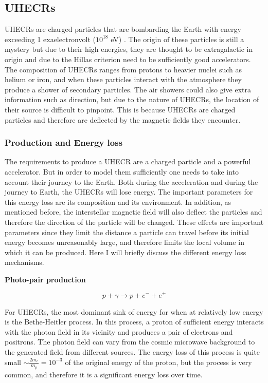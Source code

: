 \subsection{UHECRs}

UHECRs are charged particles that are bombarding the Earth with energy exceeding 1 exaelectronvolt ($10^{18}$ eV) \cite{Alves_Batista_2019}. The origin of 
these particles is still a mystery but due to their high energies, they are thought to be extragalactic in origin and due to the Hillas criterion need to be sufficiently good accelerators.
The composition of UHECRs ranges from protons to heavier nuclei such as helium or iron, and when these particles interact with the atmosphere they produce a shower of secondary particles.
The air showers could also give extra information such as direction, but due to the nature of UHECRs, the location of their source is
difficult to pinpoint. This is because UHECRs are charged particles and therefore are deflected by the magnetic fields they encounter.

\subsubsection{Production and Energy loss}
The requirements to produce a UHECR are a charged particle and a powerful accelerator. But in order to
model them sufficiently one needs to take into account their journey to the Earth. Both during the acceleration and during the journey to Earth, the UHECRs will lose energy. 
The important parameters for this energy loss are its composition and its environment. In addition, as mentioned before, the interstellar magnetic field will also deflect the particles and therefore the direction of the particle will be changed. 
These effects are important parameters since they limit the 
distance a particle can travel before its initial energy becomes unreasonably large, and therefore limits the local volume in which it can be produced. 
Here I will briefly discuss the different energy loss mechanisms.

\textbf{Photo-pair production}

\begin{equation}
    p + \gamma \rightarrow p + e^- + e^+
\end{equation}

For UHECRs, the most dominant sink of energy for when at relatively low energy is the Bethe-Heitler process. In this process, a proton of sufficient energy interacts with the 
photon field in its vicinity and produces a pair of electrons and positrons. The photon field can vary from the cosmic microwave background to the generated field from different sources. 
The energy loss of this process is quite small $\sim \frac{2m_e}{m_p}= 10^{-3}$ of the original energy of the proton, but the process is very common, and therefore it is a significant energy loss over time.


